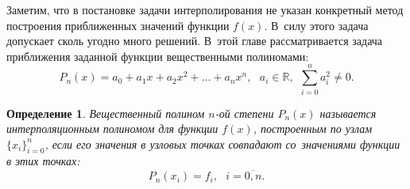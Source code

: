 \documentclass[11pt,a4paper,twoside,listtotoc,bibtotoc]{report}
\numberwithin{equation}{section}
\newtheorem*{definition}{Определение}
\theoremstyle{definition}
\theoremstyle{plain}
\begin{document}
Заметим, что в постановке задачи интерполирования не указан конкретный метод
построения приближенных значений функции $f(x)$. В~силу этого задача допускает
сколь угодно много решений. В~этой главе рассматривается
задача приближения заданной функции вещественными полиномами:
%
$$
    P_n(x)=a_0+a_1x+a_2x^{2}+\ldots+a_nx^{n}, ~~~a_i\in\mathbb{R},~~
    \sum_{i=0}^n{a_i^2} \neq 0.
$$
%
%
\begin{definition}
%
    Вещественный полином $n$-ой степени $P_n(x)$ называется интерполяционным
    полиномом для функции $f(x)$, построенным по узлам $\{x_i\}_{i=0}^n$,
    если его значения в узловых точках
    совпадают со~значениями функции в этих точках:
    \begin{equation}
    \label{interPoly}
        P_n(x_i)=f_i,~~~i=\overline{0, n}.
    \end{equation}
%
\end{definition}
%
%
\end{document}
